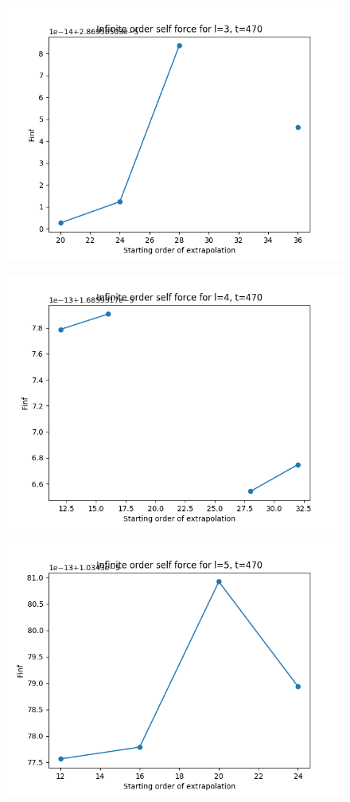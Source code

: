 \documentclass{article}
\begin{document}
\begin{figure}
  \includegraphics{bestfinfselectorplott470l3}
\end{figure}
\begin{figure}
  \includegraphics{bestfinfselectorplott470l4}
\end{figure}
\begin{figure}
  \includegraphics{bestfinfselectorplott470l5}
\end{figure}
\end{document}
